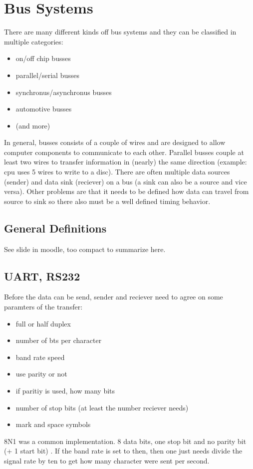 \documentclass[a4paper]{scrartcl}
\begin{document}
    \section{Bus Systems}
        There are many different kinds off bus systems and they can be classified in multiple categories:
        \begin{itemize}
            \item on/off chip busses
            \item parallel/serial busses
            \item synchronus/asynchronus busses 
            \item automotive busses
            \item (and more)
        \end{itemize}
        In general, busses consists of a couple of wires and are designed to allow computer components to communicate to each other. Parallel busses couple at least two 
        wires to transfer information in (nearly) the same direction (example: cpu uses 5 wires to write to a disc). There are often multiple data sources (sender)
        and data sink (reciever) on a bus (a sink can also be a source and vice versa). Other problems are that it needs to be defined how data can travel from source to 
        sink so there also must be a well defined timing behavior.
        \subsection{General Definitions}
            See slide in moodle, too compact to summarize here.
        \subsection{UART, RS232}
            Before the data can be send, sender and reciever need to agree on some paramters of the transfer:
            \begin{itemize}
                \item full or half duplex
                \item number of bts per character
                \item band rate speed 
                \item use parity or not
                \item if paritiy is used, how many bits
                \item number of stop bits (at least the number reciever needs)
                \item mark and space symbols %
            \end{itemize}
            8N1 was a common implementation. 8 data bits, one stop bit and no parity bit (+ 1 start bit)%
            . If the band rate is set to then, then one just needs 
            divide the signal rate by ten to get how many character were sent per second.  
\end{document}
